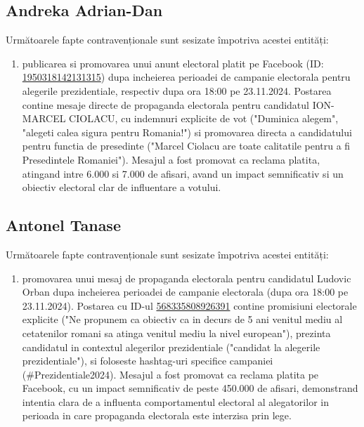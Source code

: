 \documentclass[a4paper,12pt]{article}
\begin{document}
\vspace{0.5cm}

\subsection{Andreka Adrian-Dan}
Următoarele fapte contravenționale sunt sesizate împotriva acestei entități:

\begin{enumerate}[leftmargin=*, label=\arabic*.)]
    \item publicarea si promovarea unui anunt electoral platit pe Facebook (ID: \href{https://www.facebook.com/ads/library/?id=1950318142131315}{1950318142131315}) dupa incheierea perioadei de campanie electorala pentru alegerile prezidentiale, respectiv dupa ora 18:00 pe 23.11.2024. Postarea contine mesaje directe de propaganda electorala pentru candidatul ION-MARCEL CIOLACU, cu indemnuri explicite de vot ("Duminica alegem", "alegeti calea sigura pentru Romania!") si promovarea directa a candidatului pentru functia de presedinte ("Marcel Ciolacu are toate calitatile pentru a fi Presedintele Romaniei"). Mesajul a fost promovat ca reclama platita, atingand intre 6.000 si 7.000 de afisari, avand un impact semnificativ si un obiectiv electoral clar de influentare a votului.
\end{enumerate}

\vspace{0.5cm}

\subsection{Antonel Tanase}
Următoarele fapte contravenționale sunt sesizate împotriva acestei entități:

\begin{enumerate}[leftmargin=*, label=\arabic*.)]
    \item promovarea unui mesaj de propaganda electorala pentru candidatul Ludovic Orban dupa incheierea perioadei de campanie electorala (dupa ora 18:00 pe 23.11.2024). Postarea cu ID-ul \href{https://www.facebook.com/ads/library/?id=568335808926391}{568335808926391} contine promisiuni electorale explicite ("Ne propunem ca obiectiv ca in decurs de 5 ani venitul mediu al cetatenilor romani sa atinga venitul mediu la nivel european"), prezinta candidatul in contextul alegerilor prezidentiale ("candidat la alegerile prezidentiale"), si foloseste hashtag-uri specifice campaniei (\#Prezidentiale2024). Mesajul a fost promovat ca reclama platita pe Facebook, cu un impact semnificativ de peste 450.000 de afisari, demonstrand intentia clara de a influenta comportamentul electoral al alegatorilor in perioada in care propaganda electorala este interzisa prin lege.
\end{enumerate}
\end{document}
